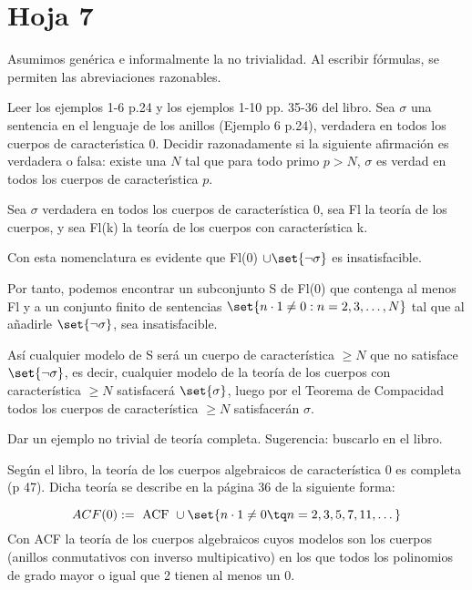 \section{Hoja 7}

Asumimos genérica e informalmente la no trivialidad. Al escribir fórmulas, se permiten
las abreviaciones razonables.

\begin{problem}
Leer los ejemplos 1-6 p.24 y los ejemplos 1-10  pp. 35-36 del libro. Sea $\sigma$
una sentencia en el lenguaje de los anillos (Ejemplo 6 p.24), verdadera en todos los
cuerpos de caracter\'{\i}stica 0. Decidir razonadamente si la siguiente afirmaci\'on
es verdadera o falsa: existe una $N$ tal que para todo primo $p > N$, $\sigma$ es verdad
en todos los cuerpos de caracter\'{\i}stica $p$.
\solution


Sea $\sigma$ verdadera en todos los cuerpos de característica 0, sea Fl la teoría de los cuerpos, y sea Fl(k) la teoría de los cuerpos con característica k. 

Con esta nomenclatura es evidente que Fl(0) $\cup \set{\neg \sigma}$ es insatisfacible.

Por tanto, podemos encontrar un subconjunto S de Fl(0) que contenga al menos Fl y a un conjunto finito de sentencias $\set{n \cdot 1 \neq 0 : n=2,3,\dots, N}$ tal que al añadirle $\set{\neg \sigma}$, sea insatisfacible. 

Así cualquier modelo de S será un cuerpo de característica $\geq N$ que no satisface $\set{\neg \sigma}$, es decir, cualquier modelo de la teoría de los cuerpos con característica $\geq N$ satisfacerá $\set{ \sigma}$, luego por el Teorema de Compacidad todos los cuerpos de característica $\geq N$ satisfacerán $\sigma$.

\end{problem}

\begin{problem}
Dar un ejemplo no trivial de teoría completa. Sugerencia: buscarlo en el libro.
\solution

Según el libro, la teoría de los cuerpos algebraicos de característica 0 es completa (p 47).
Dicha teoría se describe en la página 36 de la siguiente forma:

\[ ACF(0) := \text{ ACF } \cup \set{n \cdot 1 \neq 0 \tq n = 2,3,5,7,11, \dots} \]
Con ACF la teoría de los cuerpos algebraicos cuyos modelos son los cuerpos (anillos conmutativos con inverso multipicativo) en los que todos los polinomios de grado mayor o igual que 2 tienen al menos un 0.
\end{problem}

